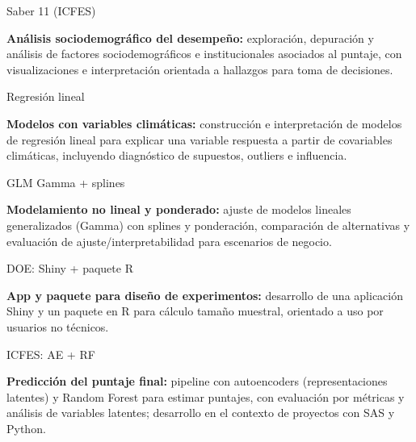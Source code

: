 
\raggedright


\begin{cvskills}

  \cvskill
    {\begin{minipage}[t]{0.28\linewidth}Saber 11 (ICFES)\end{minipage}}
    {\parbox[t]{0.72\linewidth}{\textbf{Análisis sociodemográfico del desempeño:} exploración, depuración y análisis de factores sociodemográficos e institucionales asociados al puntaje, con visualizaciones e interpretación orientada a hallazgos para toma de decisiones.}}

  \cvskill
    {\begin{minipage}[t]{0.28\linewidth}Regresión lineal\end{minipage}}
    {\parbox[t]{0.72\linewidth}{\textbf{Modelos con variables climáticas:} construcción e interpretación de modelos de regresión lineal para explicar una variable respuesta a partir de covariables climáticas, incluyendo diagnóstico de supuestos, outliers e influencia.}}

  \cvskill
    {\begin{minipage}[t]{0.28\linewidth}GLM Gamma + splines\end{minipage}}
    {\parbox[t]{0.72\linewidth}{\textbf{Modelamiento no lineal y ponderado:} ajuste de modelos lineales generalizados (Gamma) con splines y ponderación, comparación de alternativas y evaluación de ajuste/interpretabilidad para escenarios de negocio.}}

  \cvskill
    {\begin{minipage}[t]{0.28\linewidth}DOE: Shiny + paquete R\end{minipage}}
    {\parbox[t]{0.72\linewidth}{\textbf{App y paquete para diseño de experimentos:} desarrollo de una aplicación Shiny y un paquete en R para cálculo tamaño muestral, orientado a uso por usuarios no técnicos.}}

  \cvskill
    {\begin{minipage}[t]{0.28\linewidth}ICFES: AE + RF\end{minipage}}
    {\parbox[t]{0.72\linewidth}{\textbf{Predicción del puntaje final:} pipeline con autoencoders (representaciones latentes) y Random Forest para estimar puntajes, con evaluación por métricas y análisis de variables latentes; desarrollo en el contexto de proyectos con SAS y Python.}}


\end{cvskills}
